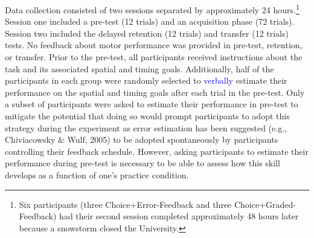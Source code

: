 \documentclass[
  man, donotrepeattitle,floatsintext]{apa7}
\begin{document}
Data collection consisted of two sessions separated by approximately 24 hours.\footnote{Six participants (three Choice+Error-Feedback and three Choice+Graded-Feedback) had their second session completed approximately 48 hours later because a snowstorm closed the University.} Session one included a pre-test (12 trials) and an acquisition phase (72 trials). Session two included the delayed retention (12 trials) and transfer (12 trials) tests. No feedback about motor performance was provided in pre-test, retention, or transfer. Prior to the pre-test, all participants received instructions about the task and its associated spatial and timing goals. Additionally, half of the participants in each group were randomly selected to \textcolor{blue}{verbally} estimate their performance on the spatial and timing goals after each trial in the pre-test. Only a subset of participants were asked to estimate their performance in pre-test to mitigate the potential that doing so would prompt participants to adopt this strategy during the experiment as error estimation has been suggested (e.g., Chiviacowsky \& Wulf, 2005) to be adopted spontaneously by participants controlling their feedback schedule. However, asking participants to estimate their performance during pre-test is necessary to be able to assess how this skill develops as a function of one's practice condition.
\end{document}
